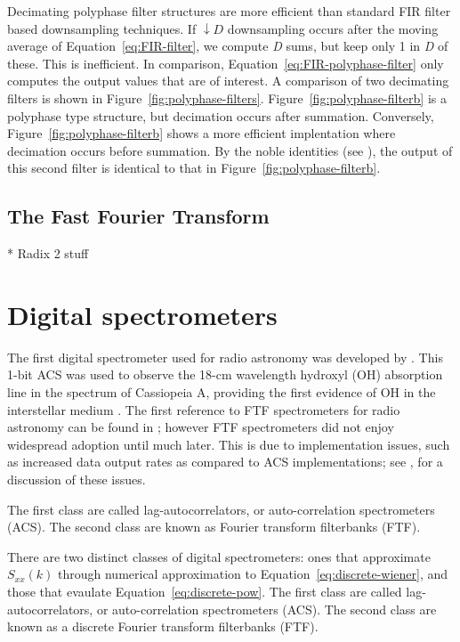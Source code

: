 \documentclass{ws-rv961x669}
\begin{document}
Decimating polyphase filter structures are more efficient than standard FIR filter based downsampling techniques. If $\downarrow D$ downsampling occurs after the moving average of Equation~\ref{eq:FIR-filter}, we compute \emph{D} sums, but keep only 1 in \emph{D} of these. This is inefficient. In comparison, Equation~\ref{eq:FIR-polyphase-filter} only computes the output values that are of interest. A comparison of two decimating filters is shown in Figure~\ref{fig:polyphase-filters}. Figure~\ref{fig:polyphase-filterb} is a polyphase type structure, but decimation occurs after summation. Conversely, Figure~\ref{fig:polyphase-filterb} shows a more efficient implentation where decimation occurs before summation. By the noble identities (see \citep{Vaidyanathan:1990p6127}), the output of this second filter is identical to that in Figure~\ref{fig:polyphase-filterb}.


\subsection{The Fast Fourier Transform}

* Radix 2 stuff

\section{Digital spectrometers}

The first digital spectrometer used for radio astronomy was developed by \citet{Weinreb:1963p10042}. This 1-bit ACS was used to observe the 18-cm wavelength hydroxyl (OH) absorption line in the spectrum of Cassiopeia A, providing the first evidence of OH in the interstellar medium \citep{Weinreb:1963p9992}. The first reference to FTF spectrometers for radio astronomy can be found in \citet{Chikada:1987p10044}; however FTF spectrometers did not enjoy widespread adoption until much later. This is due to implementation issues, such as increased data output rates as compared to ACS implementations; see \citet{Bunton2000}, for a discussion of these issues.

The first class are called lag-autocorrelators, or auto-correlation spectrometers (ACS). The second class are known as Fourier transform filterbanks (FTF).

There are two distinct classes of digital spectrometers: ones that approximate $S_{xx}(k)$ through numerical approximation to Equation~\ref{eq:discrete-wiener}, and those that evaulate Equation~\ref{eq:discrete-pow}. The first class are called lag-autocorrelators, or auto-correlation spectrometers (ACS). The second class are known as a discrete Fourier transform filterbanks (FTF).  
\end{document}
